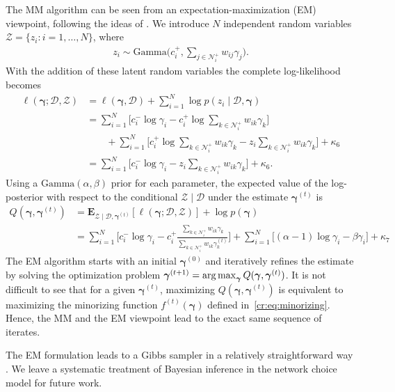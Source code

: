 The MM algorithm can be seen from an expectation-maximization (EM) viewpoint, following the ideas of \citet{caron2012efficient}.
We introduce $N$ independent random variables $\mathcal{Z} = \{ z_i : i = 1, \ldots, N \}$, where
\begin{align*}
z_i \sim \text{Gamma} \bigg( c^+_i, \sum_{j \in \mathcal{N}^+_i} w_{ij} \gamma_j \bigg).
\end{align*}
With the addition of these latent random variables the complete log-likelihood becomes
\begin{align*}
\ell(\bm{\gamma} ; \mathcal{D}, \mathcal{Z})
    &= \ell(\bm{\gamma}, \mathcal{D}) + \sum_{i = 1}^N \log p(z_i \mid \mathcal{D}, \bm{\gamma}) \\
    &= \sum_{i = 1}^N \bigg[ c^-_i \log \gamma_i - c^+_i \log \sum_{k \in \mathcal{N}^+_i} w_{ik} \gamma_k \bigg] \\
    &\qquad +\sum_{i = 1}^N \bigg[  c^+_i \log \sum_{k \in \mathcal{N}^+_i} w_{ik} \gamma_k - z_i \sum_{k \in \mathcal{N}^+_i} w_{ik} \gamma_k \bigg] + \kappa_6 \\
    &= \sum_{i = 1}^N \bigg[ c^-_i \log \gamma_i - z_i \sum_{k \in \mathcal{N}^+_i} w_{ik} \gamma_k \bigg] + \kappa_6.
\end{align*}
Using a $\text{Gamma}(\alpha, \beta)$ prior for each parameter, the expected value of the log-posterior with respect to the conditional $\mathcal{Z} \mid \mathcal{D}$ under the estimate $\bm{\gamma}^{(t)}$ is
\begin{align*}
Q(\bm{\gamma}, \bm{\gamma}^{(t)})
    &= \mathbf{E}_{\mathcal{Z} \mid \mathcal{D}, \bm{\gamma}^{(t)}} \left[ \ell(\bm{\gamma} ; \mathcal{D}, \mathcal{Z}) \right]
       + \log p(\bm{\gamma}) \\
    &=\sum_{i = 1}^N \bigg[ c^-_i \log \gamma_i - c^+_i \frac{\sum_{k \in \mathcal{N}^+_i} w_{ik} \gamma_k}{\sum_{k \in \mathcal{N}^+_i} w_{ik} \gamma^{(t)}_k} \bigg]
      + \sum_{i = 1}^N \bigg[ (\alpha -1) \log \gamma_i - \beta \gamma_i \bigg] + \kappa_7
\end{align*}
The EM algorithm starts with an initial $\bm{\gamma}^{(0)}$ and iteratively refines the estimate by solving the optimization problem $\bm{\gamma}^{(t+1)} = \operatorname*{arg\,max}_{\bm{\gamma}} Q(\bm{\gamma}, \bm{\gamma}^{(t)})$.
It is not difficult to see that for a given $\bm{\gamma}^{(t)}$, maximizing $Q(\bm{\gamma}, \bm{\gamma}^{(t)})$ is equivalent to maximizing the minorizing function $f^{(t)}(\bm{\gamma})$ defined in~\eqref{cr:eq:minorizing}.
Hence, the MM and the EM viewpoint lead to the exact same sequence of iterates.

The EM formulation leads to a Gibbs sampler in a relatively straightforward way \citep{caron2012efficient}.
We leave a systematic treatment of Bayesian inference in the network choice model for future work.
